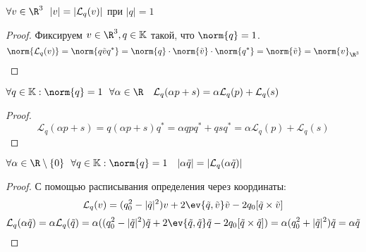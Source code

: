 \begin{lemma}
	\(\forall v \in \R^3 \ \ |v| = |\mathcal{L}_q(v)|\) при \(|q| = 1\)
\end{lemma}
\begin{proof}
	Фиксируем \(v \in \R^3, q \in \mathbb{K}\) такой, что \(\norm{q} = 1\).
	\[\norm{\mathcal{L}_q(v)} = \norm{q \tilde{v} q^*} = \norm{q} \cdot \norm{\tilde{v}} \cdot \norm{q^*} = \norm{\tilde{v}} = \norm{v}_{\R^3}\]
\end{proof}

\begin{lemma}
	\(\forall q \in \mathbb{K} : \norm{q} = 1 \ \
	\forall \alpha \in \R \quad \mathcal{L}_q(\alpha p + s) = \alpha \mathcal{L}_q(p) + \mathcal{L}_q(s)\)
\end{lemma}
\begin{proof}
	\[
		\mathcal{L}_q(\alpha p + s) = q (\alpha p + s) q^* =
		\alpha q p q^* + q s q^* = \alpha \mathcal{L}_q(p) + \mathcal{L}_q(s)
	\]
\end{proof}

\begin{lemma}
	\(\forall \alpha \in \R \setminus \{0\} \ \ \forall q \in \mathbb{K} : \norm{q} = 1 \quad |\alpha \tilde{q}| = |\mathcal{L}_q(\alpha \tilde{q})|\)
\end{lemma}
\begin{proof}
	С помощью расписывания определения через координаты:
	\begin{equation}
		\label{eq:lqv}
		\mathcal{L}_q(v) = (q_0^2 - |\tilde{q}|^2)v + 2 \ev{\tilde{q}, \tilde{v}} \tilde{v} - 2 q_0 [\tilde{q} \times \tilde{v}]
	\end{equation}
	\[\mathcal{L}_q(\alpha \tilde{q}) = \alpha \mathcal{L}_q(\tilde{q})
		= \alpha ((q_0^2 - |\tilde{q}|^2)\tilde{q} + 2 \ev{\tilde{q}, \tilde{q}} \tilde{q} - 2 q_0[\tilde{q} \times \tilde{q}])
		= \alpha (q_0^2 + |\tilde{q}|^2) \tilde{q} = \alpha \tilde{q}\]
\end{proof}

